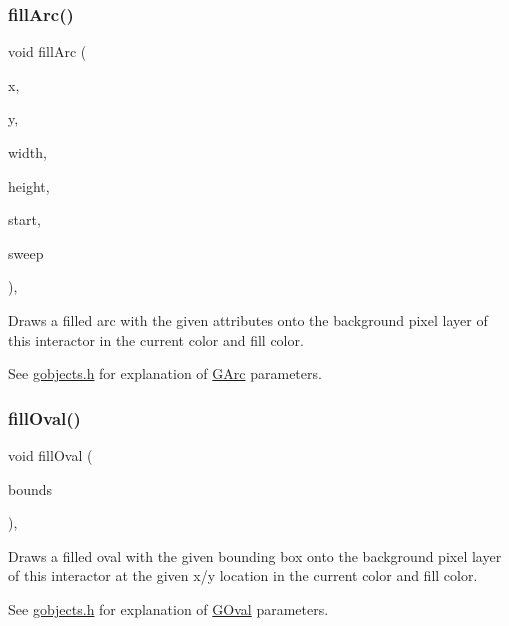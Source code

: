 \subsubsection{\texorpdfstring{fill\+Arc()}{fillArc()}}
{\footnotesize\ttfamily void fill\+Arc (\begin{DoxyParamCaption}\item[{double}]{x,  }\item[{double}]{y,  }\item[{double}]{width,  }\item[{double}]{height,  }\item[{double}]{start,  }\item[{double}]{sweep }\end{DoxyParamCaption})\hspace{0.3cm}{\ttfamily [virtual]}, {\ttfamily [inherited]}}



Draws a filled arc with the given attributes onto the background pixel layer of this interactor in the current color and fill color. 

See \mbox{\hyperlink{gobjects_8h_source}{gobjects.\+h}} for explanation of \mbox{\hyperlink{classsgl_1_1GArc}{G\+Arc}} parameters. \mbox{\label{classsgl_1_1GDrawingSurface_a1ea6e48d59fb588797dba4deab1397e0}} 
\subsubsection{\texorpdfstring{fill\+Oval()}{fillOval()}\hspace{0.1cm}{\footnotesize\ttfamily [1/2]}}
{\footnotesize\ttfamily void fill\+Oval (\begin{DoxyParamCaption}\item[{const \mbox{\hyperlink{structsgl_1_1GRectangle}{G\+Rectangle}} \&}]{bounds }\end{DoxyParamCaption})\hspace{0.3cm}{\ttfamily [virtual]}, {\ttfamily [inherited]}}



Draws a filled oval with the given bounding box onto the background pixel layer of this interactor at the given x/y location in the current color and fill color. 

See \mbox{\hyperlink{gobjects_8h_source}{gobjects.\+h}} for explanation of \mbox{\hyperlink{classsgl_1_1GOval}{G\+Oval}} parameters. \mbox{\label{classsgl_1_1GDrawingSurface_a28c700c82f31cd328a4629273420ee61}} 
